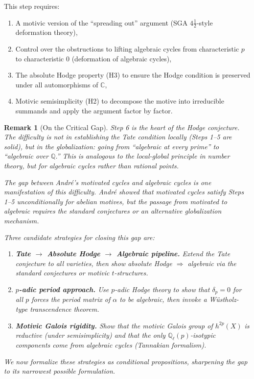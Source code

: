 \documentclass[11pt]{article}
\newtheorem{remark}[theorem]{Remark}
\theoremstyle{definition}
\begin{document}
\begin{enumerate}[label=\textbf{Step \arabic*.}, leftmargin=3cm]
    This step requires:
    \begin{enumerate}[label=(\alph*)]
      \item A motivic version of the ``spreading out'' argument
        (SGA $4\frac{1}{2}$-style deformation theory),
      \item Control over the obstructions to lifting algebraic cycles from
        characteristic $p$ to characteristic 0 (deformation of algebraic
        cycles),
      \item The absolute Hodge property (H3) to ensure the Hodge condition
        is preserved under all automorphisms of $\mathbb{C}$,
      \item Motivic semisimplicity (H2) to decompose the motive into
        irreducible summands and apply the argument factor by factor.
    \end{enumerate}
\end{enumerate}

\begin{remark}[On the Critical Gap]
\label{rem:gap}
Step 6 is the heart of the Hodge conjecture.  The difficulty is not in
establishing the Tate condition locally (Steps 1--5 are solid), but in
the \emph{globalization}: going from ``algebraic at every prime'' to
``algebraic over $\mathbb{Q}$.''  This is analogous to the local-global
principle in number theory, but for algebraic cycles rather than rational
points.

The gap between Andr\'e's motivated cycles and algebraic cycles is one
manifestation of this difficulty.  Andr\'e showed that motivated cycles
satisfy Steps 1--5 unconditionally for abelian motives, but the passage
from motivated to algebraic requires the standard conjectures or an
alternative globalization mechanism.

Three candidate strategies for closing this gap are:
\begin{enumerate}
  \item \textbf{Tate $\to$ Absolute Hodge $\to$ Algebraic pipeline.}
    Extend the Tate conjecture to all varieties, then show
    absolute Hodge $\Rightarrow$ algebraic via the standard conjectures
    or motivic $t$-structures.
  \item \textbf{$p$-adic period approach.}
    Use $p$-adic Hodge theory to show that $\delta_p = 0$ for all $p$
    forces the period matrix of $\alpha$ to be algebraic, then invoke
    a W\"ustholz-type transcendence theorem.
  \item \textbf{Motivic Galois rigidity.}
    Show that the motivic Galois group of $h^{2p}(X)$ is reductive
    (under semisimplicity) and that the only
    $\mathbb{Q}_\ell(p)$-isotypic components come from algebraic cycles
    (Tannakian formalism).
\end{enumerate}

We now formalize these strategies as conditional propositions, sharpening the
gap to its narrowest possible formulation.
\end{remark}
\end{document}

